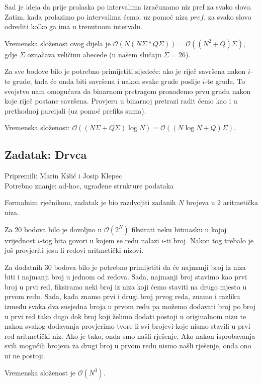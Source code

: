 \documentclass[a4paper]{article}
\begin{document}
Sad je ideja da prije prolaska po intervalima izračunamo niz pref za svako
slovo. Zatim, kada prolazimo po intervalima ćemo, uz pomoć niza $pref$, za svako
slovo odrediti kolko ga ima u trenutnom intervalu.

Vremenska složenost ovog dijela je $\mathcal{O}(N(N\Sigma * Q\Sigma))=
\mathcal{O}((N^2 + Q)\Sigma)$, gdje $\Sigma$ označava veličinu abecede
(u našem slučaju $\Sigma=26$).

Za sve bodove bilo je potrebno primijetiti sljedeće: ako je riječ savršena nakon
$i$-te grude, tada će onda biti savršena i nakon svake grude poslije $i$-te
grude. To svojstvo nam omogućava da binarnom pretragom pronađemo prvu grudu
nakon koje riječ postane savršena. Provjeru u binarnoj pretrazi radit ćemo kao
i u prethodnoj parcijali (uz pomoć prefiks suma).

Vremenska složenost: $\mathcal{O}((N\Sigma + Q\Sigma)\log N) = \mathcal{O}((N \log N + Q)\Sigma)$.

\subsection*{Zadatak: Drvca}
\textsf{Pripremili: Marin Kišić i Josip Klepec}\\
\textsf{Potrebno znanje: ad-hoc, ugrađene strukture podataka}

Formalnim rječnikom, zadatak je bio razdvojiti zadanih $N$ brojeva u $2$
aritmetička niza.

Za 20 bodova bilo je dovoljno u $\mathcal{O}(2^N)$ fiksirati neku bitmasku u
kojoj vrijednost $i$-tog bita govori u kojem se redu nalazi $i$-ti broj. Nakon
tog trebalo je još provjeriti jesu li redovi aritmetički nizovi.

Za dodatnih $30$ bodova bilo je potrebno primijetiti da će najmanji broj iz
niza biti i najmanji broj u jednom od redova. Sada, najmanji broj stavimo kao
prvi broj u prvi red, fiksiramo neki broj iz niza koji ćemo staviti na drugo
mjesto u prvom redu. Sada, kada znamo prvi i drugi broj prvog reda, znamo i
razliku između svaka dva susjedna broja u prvom redu pa možemo dodavati broj po
broj u prvi red tako dugo dok broj koji želimo dodati postoji u originalnom
nizu te  nakon svakog dodavanja provjerimo tvore li svi brojevi koje nismo
stavili u prvi red aritmetički niz.  Ako je tako, onda smo našli rješenje. Ako
nakon isprobavanja svih mogućih brojeva za drugi broj u prvom redu nismo našli
rješenje, onda ono ni ne postoji.

Vremenska složenost je $\mathcal{O}(N^3)$.
\end{document}
